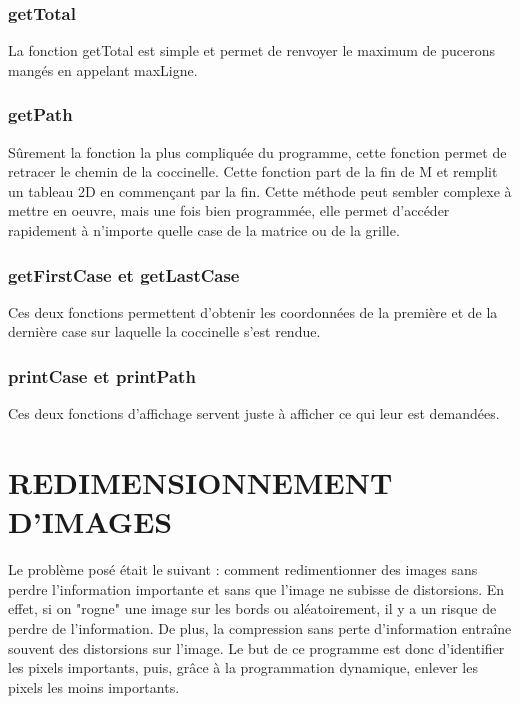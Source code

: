 \documentclass[12pt]{article}
\begin{document}
\subsubsection{getTotal}
La fonction getTotal est simple et permet de renvoyer le maximum de pucerons mangés en appelant maxLigne.

\subsubsection{getPath}
Sûrement la fonction la plus compliquée du programme, cette fonction permet de retracer le chemin de la coccinelle. Cette fonction part de la fin de M et remplit un tableau 2D en commençant par la fin. Cette méthode peut sembler complexe à mettre en oeuvre, mais une fois bien programmée, elle permet d'accéder rapidement à n'importe quelle case de la matrice ou de la grille.

\subsubsection{getFirstCase et getLastCase}
Ces deux fonctions permettent d'obtenir les coordonnées de la première et de la dernière case sur laquelle la coccinelle s'est rendue.

\subsubsection{printCase et printPath}
Ces deux fonctions d'affichage servent juste à afficher ce qui leur est demandées.

\newpage


\section{REDIMENSIONNEMENT D'IMAGES}
Le problème posé était le suivant : comment redimentionner des images sans perdre l'information importante et sans que l'image ne subisse de distorsions. En effet, si on "rogne" une image sur les bords ou aléatoirement, il y a un risque de perdre de l'information. De plus, la compression sans perte d'information entraîne souvent des distorsions sur l'image.
\newline Le but de ce programme est donc d'identifier les pixels importants, puis, grâce à la programmation dynamique, enlever les pixels les moins importants.
\end{document}
